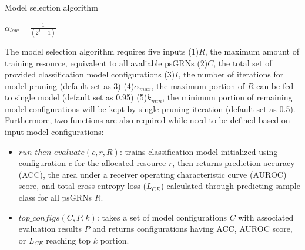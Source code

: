 \documentclass[fleqn,10pt]{wlscirep}
\begin{document}
    \begin{algorithm}
    \caption{Model selection algorithm}
    \label{alg:one}
    $\alpha_{low} = \frac{1}{(2 ^ {I} - 1)}$\;
    \end{algorithm}

    The model selection algorithm requires five inputs
    (1)$R$, the maximum amount of training resource, equivalent to all avaliable psGRNs
    (2)$C$, the total set of provided classification model configurations
    (3)$I$, the number of iterations for model pruning (default set as 3)
    (4)$\alpha_{max}$, the maximum portion of $R$ can be fed to single model (default set as 0.95)
    (5)$k_{min}$, the minimum portion of remaining model configurations will be kept by single pruning iteration (default set as 0.5).
    Furthermore, two functions are also required while need to be defined based on input model configurations:
    \begin{itemize}
    \setlength\itemsep{0em}
    \item \textbf{$run\_then\_evaluate(c, r, R)$}: trains classification model initialized using configuration $c$ for the allocated resource $r$, then returns prediction accuracy (ACC), the area under a receiver operating characteristic curve (AUROC)\cite{hanley_mcneil_1982} score, and total cross-entropy loss ($L_{CE}$) calculated through predicting sample class for all psGRNs $R$.

    \item \textbf{$top\_configs(C, P, k)$}: takes a set of model configurations $C$ with associated evaluation results $P$ and returns configurations having ACC, AUROC score, or $L_{CE}$ reaching top $k$ portion.
    \end{itemize}
\end{document}
